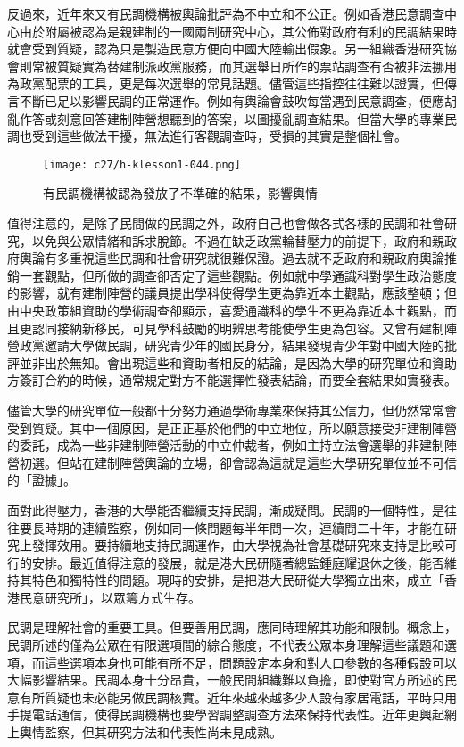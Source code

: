 反過來，近年來又有民調機構被輿論批評為不中立和不公正。例如香港民意調查中心由於附屬被認為是親建制的一國兩制研究中心，其公佈對政府有利的民調結果時就會受到質疑，認為只是製造民意方便向中國大陸輸出假象。另一組織香港研究協會則常被質疑實為替建制派政黨服務，而其選舉日所作的票站調查有否被非法挪用為政黨配票的工具，更是每次選舉的常見話題。儘管這些指控往往難以證實，但傳言不斷已足以影響民調的正常運作。例如有輿論會鼓吹每當遇到民意調查，便應胡亂作答或刻意回答建制陣營想聽到的答案，以圖擾亂調查結果。但當大學的專業民調也受到這些做法干擾，無法進行客觀調查時，受損的其實是整個社會。

\begin{figure}[htbp]
    \centering
    \texttt{[image: c27/h-klesson1-044.png]}
    \caption{有民調機構被認為發放了不準確的結果，影響輿情} 
\end{figure}

值得注意的，是除了民間做的民調之外，政府自己也會做各式各樣的民調和社會研究，以免與公眾情緒和訴求脫節。不過在缺乏政黨輪替壓力的前提下，政府和親政府輿論有多重視這些民調和社會研究就很難保證。過去就不乏政府和親政府輿論推銷一套觀點，但所做的調查卻否定了這些觀點。例如就中學通識科對學生政治態度的影響，就有建制陣營的議員提出學科使得學生更為靠近本土觀點，應該整頓；但由中央政策組資助的學術調查卻顯示，喜愛通識科的學生不更為靠近本土觀點，而且更認同接納新移民，可見學科鼓勵的明辨思考能使學生更為包容。又曾有建制陣營政黨邀請大學做民調，研究青少年的國民身分，結果發現青少年對中國大陸的批評並非出於無知。會出現這些和資助者相反的結論，是因為大學的研究單位和資助方簽訂合約的時候，通常規定對方不能選擇性發表結論，而要全套結果如實發表。

儘管大學的研究單位一般都十分努力通過學術專業來保持其公信力，但仍然常常會受到質疑。其中一個原因，是正正基於他們的中立地位，所以願意接受非建制陣營的委託，成為一些非建制陣營活動的中立仲裁者，例如主持立法會選舉的非建制陣營初選。但站在建制陣營輿論的立場，卻會認為這就是這些大學研究單位並不可信的「證據」。

面對此得壓力，香港的大學能否繼續支持民調，漸成疑問。民調的一個特性，是往往要長時期的連續監察，例如同一條問題每半年問一次，連續問二十年，才能在研究上發揮效用。要持續地支持民調運作，由大學視為社會基礎研究來支持是比較可行的安排。最近值得注意的發展，就是港大民研隨著總監鍾庭耀退休之後，能否維持其特色和獨特性的問題。現時的安排，是把港大民研從大學獨立出來，成立「香港民意研究所」，以眾籌方式生存。

民調是理解社會的重要工具。但要善用民調，應同時理解其功能和限制。概念上，民調所述的僅為公眾在有限選項間的綜合態度，不代表公眾本身理解這些議題和選項，而這些選項本身也可能有所不足，問題設定本身和對人口參數的各種假設可以大幅影響結果。民調本身十分昂貴，一般民間組織難以負擔，即使對官方所述的民意有所質疑也未必能另做民調核實。近年來越來越多少人設有家居電話，平時只用手提電話通信，使得民調機構也要學習調整調查方法來保持代表性。近年更興起網上輿情監察，但其研究方法和代表性尚未見成熟。

